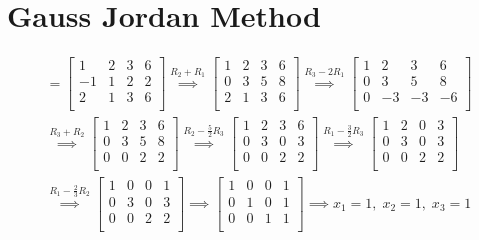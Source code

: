 \documentclass[12pt, a4paper]{article}
\begin{document}
\section{Gauss Jordan Method}
\begin{gather*}
  [A \; | \; b] = 
  \left[ \begin{array}{ccc|c}
    1 & 2 & 3 & 6\\
    -1 & 1 & 2 & 2\\
    2 & 1 & 3 & 6\\
  \end{array} \right] 
  \overset{R_2 + R_1}{\implies} 
  \left[ \begin{array}{ccc|c}
    1 & 2 & 3 & 6\\
    0 & 3 & 5 & 8\\
    2 & 1 & 3 & 6\\
  \end{array} \right] 
  \overset{R_3 - 2R_1}{\implies} 
  \left[ \begin{array}{ccc|c}
    1 & 2 & 3 & 6\\
    0 & 3 & 5 & 8\\
    0 & -3 & -3 & -6\\
  \end{array} \right] \\[5pt]
  \overset{R_3 + R_2}{\implies} 
  \left[ \begin{array}{ccc|c}
    1 & 2 & 3 & 6\\
    0 & 3 & 5 & 8\\
    0 & 0 & 2 & 2\\
  \end{array} \right]
  \overset{R_2 - \frac{5}{2}R_3}{\implies} 
  \left[ \begin{array}{ccc|c}
    1 & 2 & 3 & 6\\
    0 & 3 & 0 & 3\\
    0 & 0 & 2 & 2\\
  \end{array} \right]
  \overset{R_1 - \frac{3}{2}R_3}{\implies} 
  \left[ \begin{array}{ccc|c}
    1 & 2 & 0 & 3\\
    0 & 3 & 0 & 3\\
    0 & 0 & 2 & 2\\
  \end{array} \right] \\[5pt]
  \overset{R_1 - \frac{2}{3}R_2}{\implies} 
  \left[ \begin{array}{ccc|c}
    1 & 0 & 0 & 1\\
    0 & 3 & 0 & 3\\
    0 & 0 & 2 & 2\\
  \end{array} \right] \implies
  \left[ \begin{array}{ccc|c}
    1 & 0 & 0 & 1\\
    0 & 1 & 0 & 1\\
    0 & 0 & 1 & 1\\
  \end{array} \right] \implies
  x_1 = 1, \; x_2 = 1, \; x_3 = 1
\end{gather*}
\end{document}

